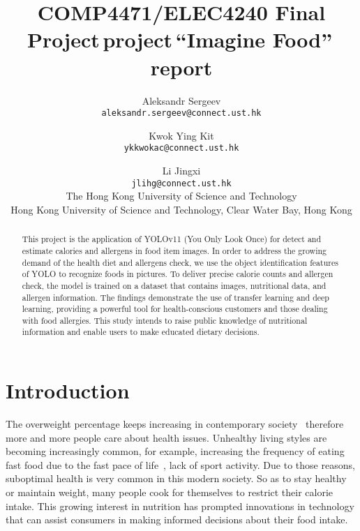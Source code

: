 \documentclass[10pt,twocolumn,letterpaper]{article}
\def\cvprPaperID{``Imagine Food''}
\def\confName{COMP4471/ELEC4240 Final Project}
\begin{document}
\title{\confName\,project\,\cvprPaperID\,report}

\author{
    Aleksandr Sergeev\\
    {\tt\small aleksandr.sergeev@connect.ust.hk}
    \and
    Kwok Ying Kit\\
    {\tt\small ykkwokac@connect.ust.hk}
    \and
    Li Jingxi\\
    {\tt\small jlihg@connect.ust.hk}\\
    The Hong Kong University of Science and Technology\\
    Hong Kong University of Science and Technology, Clear Water Bay, Hong Kong
}
\maketitle


\begin{abstract}
        This project is the application of YOLOv11 (You Only Look Once) for detect and estimate calories and allergens in food item images.
        In order to address the growing demand of the health diet and allergens check, we use the object identification features of YOLO to recognize foods in pictures.
        To deliver precise calorie counts and allergen check, the model is trained on a dataset that contains images, nutritional data, and allergen information.
        The findings demonstrate the use of transfer learning and deep learning, providing a powerful tool for health-conscious customers and those dealing with food allergies.
        This study intends to raise public knowledge of nutritional information and enable users to make educated dietary decisions.
\end{abstract}


\section{Introduction}\label{sec:intro}

The overweight percentage keeps increasing in contemporary society~\cite{nihoverweightobesity} therefore more and more people care about health issues.
Unhealthy living styles are becoming increasingly common, for example, increasing the frequency of eating fast food due to the fast pace of life~\cite{worldpopulationreviewfastfood}, lack of sport activity.
Due to those reasons, suboptimal health is very common in this modern society.
So as to stay healthy or maintain weight, many people cook for themselves to restrict their calorie intake.
This growing interest in nutrition has prompted innovations in technology that can assist consumers in making informed decisions about their food intake.
\end{document}

